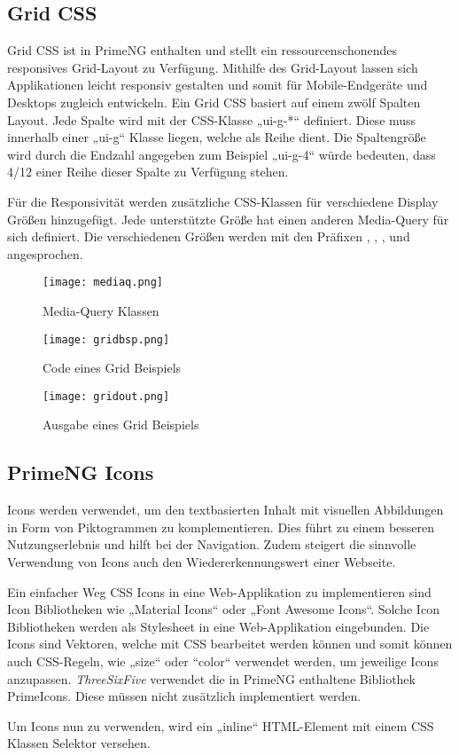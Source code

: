 \subsection{Grid CSS}
Grid CSS ist in PrimeNG enthalten und stellt ein ressourcenschonendes responsives Grid-Layout zu Verfügung. Mithilfe des Grid-Layout lassen sich Applikationen leicht responsiv gestalten und somit für Mobile-Endgeräte und Desktops zugleich entwickeln. Ein Grid CSS basiert auf einem zwölf Spalten Layout. Jede Spalte wird mit der CSS-Klasse „ui-g-*“ definiert. Diese muss innerhalb einer „ui-g“ Klasse liegen, welche als Reihe dient. Die Spaltengröße wird durch die Endzahl angegeben zum Beispiel „ui-g-4“ würde bedeuten, dass 4/12 einer Reihe dieser Spalte zu Verfügung stehen.

Für die Responsivität werden zusätzliche CSS-Klassen für verschiedene Display Größen hinzugefügt. Jede unterstützte Größe hat einen anderen Media-Query für sich definiert. Die verschiedenen Größen werden mit den Präfixen , , , und  angesprochen.

\begin{figure}[H] \centering \texttt{[image: mediaq.png]} \caption{Media-Query Klassen} \end{figure}

\begin{figure}[H] \centering \texttt{[image: gridbsp.png]} \caption{Code eines Grid Beispiels} \end{figure}
\begin{figure}[H] \centering \texttt{[image: gridout.png]} \caption{Ausgabe eines Grid Beispiels} \end{figure}

\subsection{PrimeNG Icons}
Icons\cite{CSSIcons} werden verwendet, um den textbasierten Inhalt mit visuellen Abbildungen in Form von Piktogrammen zu komplementieren. Dies führt zu einem besseren Nutzungserlebnis und hilft bei der Navigation. Zudem steigert die sinnvolle Verwendung von Icons auch den Wiedererkennungswert einer Webseite.

Ein einfacher Weg CSS Icons in eine Web-Applikation zu implementieren sind Icon Bibliotheken wie „Material Icons“ oder „Font Awesome Icons“. Solche Icon Bibliotheken werden als Stylesheet in eine Web-Applikation eingebunden. Die Icons sind Vektoren, welche mit CSS bearbeitet werden können und somit können auch CSS-Regeln, wie „size“ oder “color“ verwendet werden, um jeweilige Icons anzupassen. \textit{ThreeSixFive} verwendet die in PrimeNG enthaltene Bibliothek PrimeIcons. Diese müssen nicht zusätzlich implementiert werden.

Um Icons nun zu verwenden, wird ein „inline“ HTML-Element mit einem CSS Klassen Selektor versehen.
